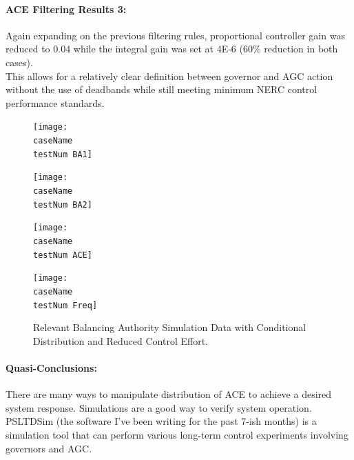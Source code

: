 \documentclass[12pt]{article}
\begin{document}
\paragraph{ACE Filtering Results 3:} Again expanding on the previous filtering rules, proportional controller gain was reduced to 0.04 while the integral gain was set at 4E-6 (60\% reduction in both cases).\\ This allows for a relatively clear definition between governor and AGC action without the use of deadbands while still meeting minimum NERC control performance standards.\vspace{-1em}
\renewcommand{\testNum}{4}
\begin{figure}[h!]
		\centering
		\texttt{[image: \\caseName\\testNum BA1]}\vspace{-1em}
\end{figure}\vspace{-1.5em}
\begin{figure}[h!]
		\centering
		\texttt{[image: \\caseName\\testNum BA2]}\vspace{-1em}
\end{figure}\vspace{-1.5em}
\begin{figure}[h!]
		\centering
		\texttt{[image: \\caseName\\testNum ACE]}\vspace{-1em}
\end{figure}\vspace{-1.5em}
\begin{figure}[h!]
		\centering
		\texttt{[image: \\caseName\\testNum Freq]}\vspace{-1em}
		\caption{Relevant Balancing Authority Simulation Data with Conditional Distribution and Reduced Control Effort.}
		\label{PI 2 Results}		 
\end{figure}\vspace{-1.5em}

\paragraph{Quasi-Conclusions:} There are many ways to manipulate distribution of ACE to achieve a desired system response. Simulations are a good way to verify system operation. \\

PSLTDSim (the software I've been writing for the past 7-ish months) is a simulation tool that can perform various long-term control experiments involving governors and AGC.
\end{document}
